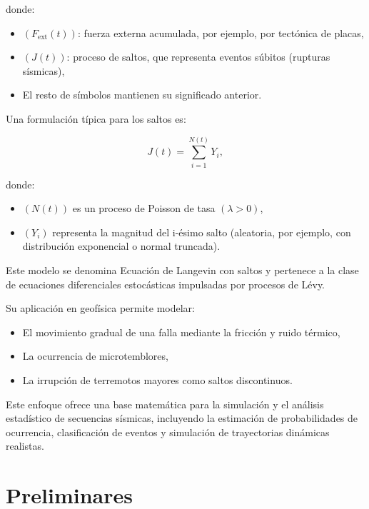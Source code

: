 \documentclass[
  spanish,
  us-letterpaper,
]{scrreprt}
\providecommand{\tightlist}{%
  \setlength{\itemsep}{0pt}\setlength{\parskip}{0pt}}
\theoremstyle{plain}
\theoremstyle{plain}
\theoremstyle{definition}
\theoremstyle{plain}
\theoremstyle{remark}
\begin{document}
donde:

\begin{itemize}
\tightlist
\item
  \(( F_{\text{ext}}(t) )\): fuerza externa acumulada, por ejemplo, por
  tectónica de placas,
\item
  \(( J(t) )\): proceso de saltos, que representa eventos súbitos
  (rupturas sísmicas),
\item
  El resto de símbolos mantienen su significado anterior.
\end{itemize}

Una formulación típica para los saltos es:

\[
J(t) = \sum_{i=1}^{N(t)} Y_i,
\]

donde:

\begin{itemize}
\tightlist
\item
  \(( N(t) )\) es un proceso de Poisson de tasa \((\lambda> 0 )\),
\item
  \(( Y_i )\) representa la magnitud del i-ésimo salto (aleatoria, por
  ejemplo, con distribución exponencial o normal truncada).
\end{itemize}

Este modelo se denomina Ecuación de Langevin con saltos y pertenece a la
clase de ecuaciones diferenciales estocásticas impulsadas por procesos
de Lévy.

Su aplicación en geofísica permite modelar:

\begin{itemize}
\tightlist
\item
  El movimiento gradual de una falla mediante la fricción y ruido
  térmico,
\item
  La ocurrencia de microtemblores,
\item
  La irrupción de terremotos mayores como saltos discontinuos.
\end{itemize}

Este enfoque ofrece una base matemática para la simulación y el análisis
estadístico de secuencias sísmicas, incluyendo la estimación de
probabilidades de ocurrencia, clasificación de eventos y simulación de
trayectorias dinámicas realistas.


\chapter{Preliminares}\label{preliminares}
\end{document}
